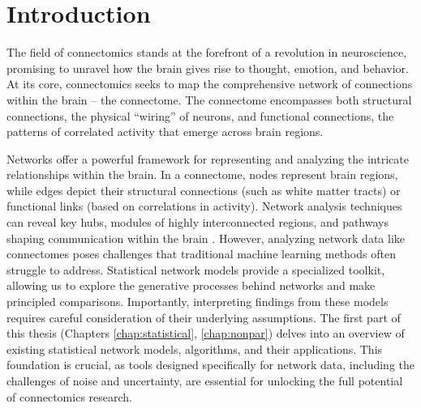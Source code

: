 \chapter{Introduction} \label{chap-intro}

The field of connectomics stands at the forefront of a revolution in neuroscience, promising to unravel how the brain gives rise to thought, emotion, and behavior. At its core, connectomics seeks to map the comprehensive network of connections within the brain – the connectome. The connectome encompasses both structural connections, the physical ``wiring'' of neurons, and functional connections, the patterns of correlated activity that emerge across brain regions. 

Networks offer a powerful framework for representing and analyzing the intricate relationships within the brain. In a connectome, nodes represent brain regions, while edges depict their structural connections (such as white matter tracts) or functional links (based on correlations in activity). Network analysis techniques can reveal key hubs, modules of highly interconnected regions, and pathways shaping communication within the brain \cite{sporns2005human, behrens2012human, van2016comparative, fornito2015connectomics, griffa2013structural}. However, analyzing network data like connectomes poses challenges that traditional machine learning methods often struggle to address. Statistical network models provide a specialized toolkit, allowing us to explore the generative processes behind networks and make principled comparisons. Importantly, interpreting findings from these models requires careful consideration of their underlying assumptions. The first part of this thesis (Chapters \ref{chap:statistical}, \ref{chap:nonpar}) delves into an overview of existing statistical network models, algorithms, and their applications. This foundation is crucial, as tools designed specifically for network data, including the challenges of noise and uncertainty, are essential for unlocking the full potential of connectomics research.

